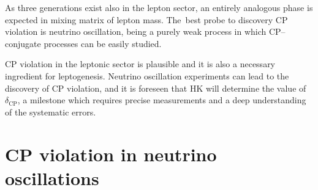 As three generations exist also in the lepton sector, %
an entirely analogous phase is expected in mixing matrix of lepton mass.
The~best probe to discovery CP violation is neutrino oscillation, being a purely weak process in which %
\mbox{CP--con}\-ju\-gate processes can be easily studied.

CP violation in the leptonic sector is plausible and it is also a necessary ingredient for leptogenesis.
Neutrino oscillation experiments can lead to the discovery of CP violation, and it is %
foreseen that HK will determine the value of~$\delta_\text{CP}$, %
a milestone which requires precise measurements and a deep understanding of the systematic errors.


\section{CP violation in neutrino oscillations}
\label{sec:cp_oscillation}

